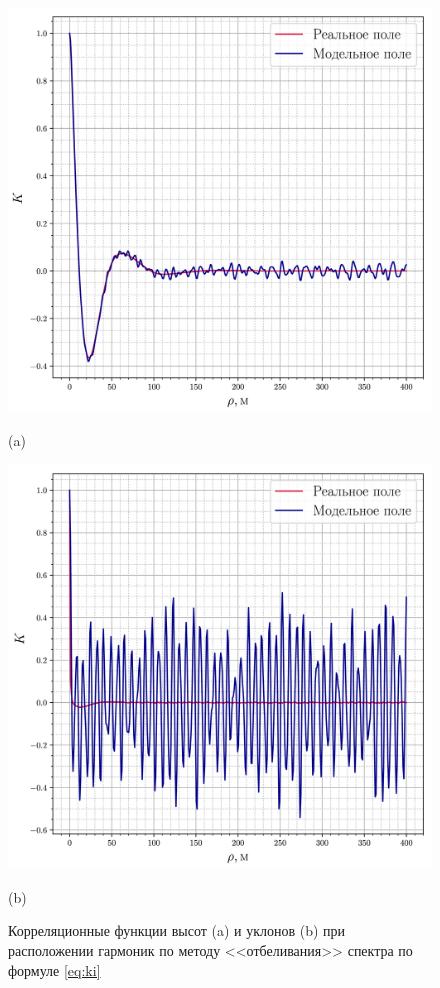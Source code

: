 \begin{figure}[ht]
    \centering
    \begin{minipage}{0.49\linewidth}
        \centering
        \includegraphics[width=\linewidth]{fig/correlation_height_height2.png}


        (a)
    \end{minipage}
    \begin{minipage}{0.49\linewidth}
        \centering
        \includegraphics[width=\linewidth]{fig/correlation_angles_height2.png}



        (b)
    \end{minipage}

    \caption{ Корреляционные функции высот (a) и уклонов (b) при расположении гармоник
    по методу <<отбеливания>> спектра по формуле \eqref{eq:ki} }
    \label{fig:ki}
\end{figure}

